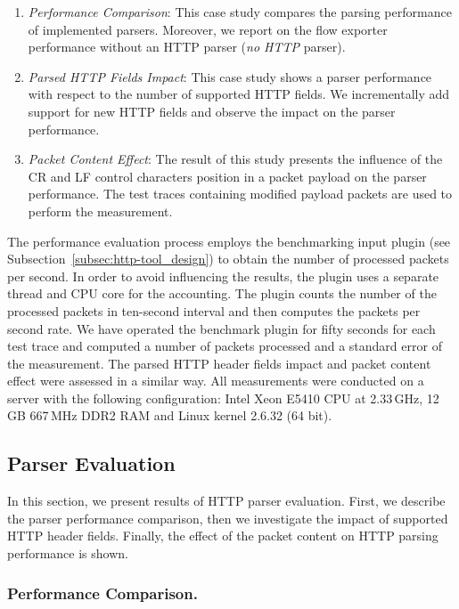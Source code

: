 \begin{enumerate}
    \item \emph{Performance Comparison}: This case study compares the parsing performance of implemented parsers. Moreover, we report on the flow exporter performance without an HTTP parser (\emph{no HTTP} parser).
    \item \emph{Parsed HTTP Fields Impact}: This case study shows a parser performance with respect to the number of supported HTTP fields. We incrementally add support for new HTTP fields and observe the impact on the parser performance.
    \item \emph{Packet Content Effect}: The result of this study presents the influence of the CR and LF control characters position in a packet payload on the parser performance. The test traces containing modified payload packets are used to perform the measurement.
\end{enumerate}

The performance evaluation process employs the benchmarking input plugin (see Subsection~\ref{subsec:http-tool_design}) to obtain the number of processed packets per second. 
In order to avoid influencing the results, the plugin uses a separate thread and CPU core for the accounting. The plugin counts the number of the processed packets in ten-second interval and then computes the packets per second rate. We have operated the benchmark plugin for fifty seconds for each test trace and computed a number of packets processed and a standard error of the measurement. The parsed HTTP header fields impact and packet content effect were assessed in a similar way. All measurements were conducted on a server with the following configuration: Intel Xeon E5410 CPU at 2.33\,GHz, 12\,GB 667\,MHz DDR2 RAM and Linux kernel 2.6.32 (64 bit).

\subsection{Parser Evaluation} \label{subsec:http-perform_evaluation}

In this section, we present results of HTTP parser evaluation. First, we describe the parser performance comparison, then we investigate the impact of supported HTTP header fields. Finally, the effect of the packet content on HTTP parsing performance is shown.

\subsubsection*{Performance Comparison.}

